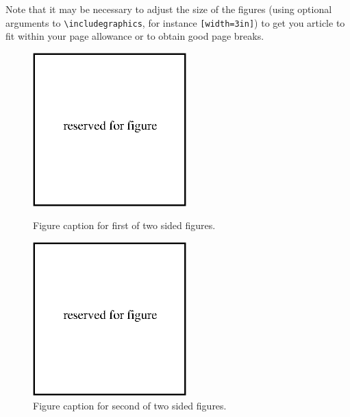 \documentclass[a4paper]{jpconf}
\begin{document}
Note that it may be necessary to adjust the size of the figures (using optional arguments to \verb"\includegraphics", for instance \verb"[width=3in]") to get you article to fit within your page allowance or to obtain good page breaks.

\begin{figure}[h]
    \begin{minipage}{14pc}
        \includegraphics[width=14pc]{name.eps}
        \caption{\label{label}Figure caption for first of two sided figures.}
    \end{minipage}\hspace{2pc}%
    \begin{minipage}{14pc}
        \includegraphics[width=14pc]{name.eps}
        \caption{\label{label}Figure caption for second of two sided figures.}
    \end{minipage}
\end{figure}
\end{document}

